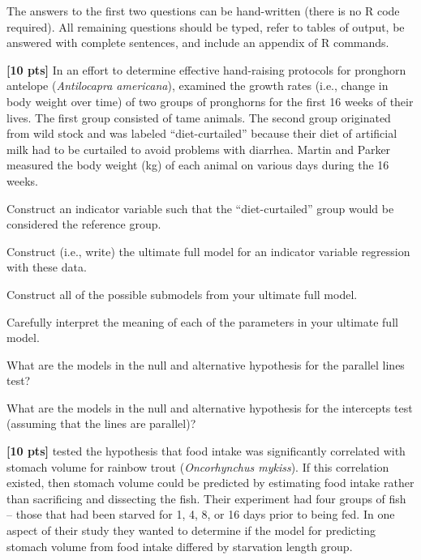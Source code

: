 \documentclass[10pt,openany]{book}\usepackage[]{graphicx}\usepackage[]{color}
\begin{document}
\vspace{36pt}
\begin{hwsection}{The answers to the first two questions can be hand-written (there is no R code required).  All remaining questions should be typed, refer to tables of output, be answered with complete sentences, and include an appendix of R commands.}

  \item \label{hwprob:LMIVRPronghorn1} \textbf{[10 pts]} In an effort to determine effective hand-raising protocols for pronghorn antelope (\emph{Antilocapra americana}), \cite{MartinParker1997} examined the growth rates (i.e., change in body weight over time) of two groups of pronghorns for the first 16 weeks of their lives.  The first group consisted of tame animals.  The second group originated from wild stock and was labeled ``diet-curtailed'' because their diet of artificial milk had to be curtailed to avoid problems with diarrhea.  Martin and Parker measured the body weight (kg) of each animal on various days during the 16 weeks.

    \begin{Enumerate}
      \item Construct an indicator variable such that the ``diet-curtailed'' group would be considered the reference group.
      \item Construct (i.e., write) the ultimate full model for an indicator variable regression with these data.
      \item Construct all of the possible submodels from your ultimate full model.
      \item Carefully interpret the meaning of each of the parameters in your ultimate full model.
      \item What are the models in the null and alternative hypothesis for the parallel lines test?
      \item What are the models in the null and alternative hypothesis for the intercepts test (assuming that the lines are parallel)?
    \end{Enumerate}

  \item \label{hwprob:LMIVRStomach1} \textbf{[10 pts]} \cite{PirhonenKoskela2005} tested the hypothesis that food intake was significantly correlated with stomach volume for rainbow trout (\emph{Oncorhynchus mykiss}).  If this correlation existed, then stomach volume could be predicted by estimating food intake rather than sacrificing and dissecting the fish.  Their experiment had four groups of fish -- those that had been starved for 1, 4, 8, or 16 days prior to being fed.  In one aspect of their study they wanted to determine if the model for predicting stomach volume from food intake differed by starvation length group.


\end{hwsection}
\end{document}
